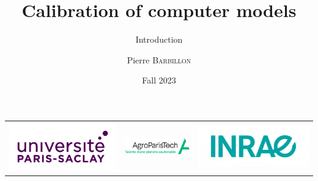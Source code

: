 \documentclass[nopagenumber,9pt]{beamer}
\title[Introduction]{Calibration of computer models}
\subtitle{Introduction}
\author[P. Barbillon]{ Pierre \textsc{Barbillon}}
\date{Fall 2023}
\begin{document}
\begin{frame}
\titlepage
\vspace{-1cm}
\centering
\begin{tabular}{ccc}
 \includegraphics[scale=.08]{LogoUPSaclay.jpg}&
  \includegraphics[scale=1.3]{agrologo.png}&
   \includegraphics[scale=.1]{LogoINRAE.jpg}
\end{tabular}


\end{frame}
\end{document}
